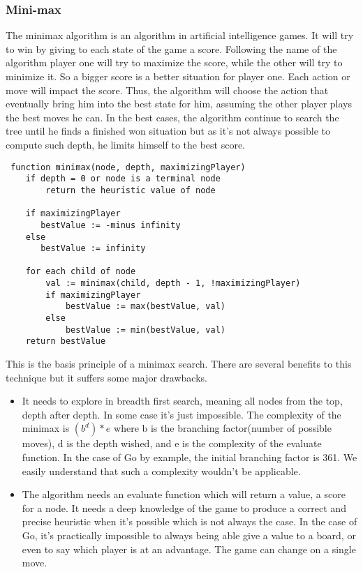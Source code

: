 \subsubsection{Mini-max}

The minimax algorithm is an algorithm in artificial intelligence games. It will try to win by giving to each state of the game a score. Following the name of the algorithm player one
 will try to maximize the score, while the other will try to minimize it. So a bigger score is a better situation for player one. Each action or move will impact the score. Thus, the algorithm will choose the action that eventually bring him into the best state for him, assuming the other player plays the best moves he can. In the best cases, the algorithm continue to search the tree until he finds a finished won situation but as it's not always possible to compute such depth, he limits himself to the best score. 
\\

 \begin{verbatim}
 function minimax(node, depth, maximizingPlayer)
    if depth = 0 or node is a terminal node
        return the heuristic value of node
    
    if maximizingPlayer
       bestValue := -minus infinity
    else
       bestValue := infinity
    
    for each child of node
        val := minimax(child, depth - 1, !maximizingPlayer)
        if maximizingPlayer
            bestValue := max(bestValue, val)
        else
            bestValue := min(bestValue, val)
    return bestValue
 \end{verbatim}
 
 This is the basis principle of a minimax search. There are several benefits to this technique but it suffers some major drawbacks. 
 
 \begin{itemize}
 \item It needs to explore in breadth first search, meaning all nodes from the top, depth after depth. In some case it's just impossible. The complexity of the minimax is $(b^d)*e$ where b is the branching factor(number of possible moves), d is the depth wished, and e is the complexity of the evaluate function. In the case of Go by example, the initial branching factor is 361. We easily understand that such a complexity wouldn't be applicable.
 \item The algorithm needs an evaluate function which will return a value, a score for a node. It needs a deep knowledge of the game to produce a correct and precise heuristic when it's possible which is not always the case. In the case of Go, it's practically impossible to always being able give a value to a board, or even to say which player is at an advantage. The game can change on a single move. 
 \end{itemize}

